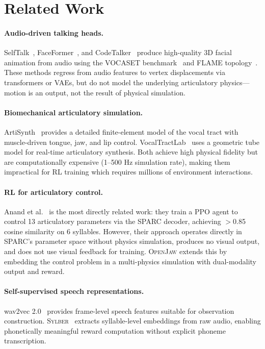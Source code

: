 \documentclass[11pt, a4paper]{article}
\newcommand{\openjaw}{\textsc{OpenJaw}}
\newcommand{\sparc}{\textsc{SPARC}}
\newcommand{\sylber}{\textsc{Sylber}}
\newcommand{\flame}{\textsc{FLAME}}
\begin{document}
\section{Related Work}
\label{sec:related_work}

\paragraph{Audio-driven talking heads.}
SelfTalk~\cite{richard2021selftalk}, FaceFormer~\cite{fan2022faceformer}, and CodeTalker~\cite{xing2023codetalker} produce high-quality 3D facial animation from audio using the VOCASET benchmark~\cite{li2021vocaset} and \flame{} topology~\cite{li2017flame}. These methods regress from audio features to vertex displacements via transformers or VAEs, but do not model the underlying articulatory physics---motion is an output, not the result of physical simulation.

\paragraph{Biomechanical articulatory simulation.}
ArtiSynth~\cite{freeman2023artisynth} provides a detailed finite-element model of the vocal tract with muscle-driven tongue, jaw, and lip control. VocalTractLab~\cite{tian2019vocaltractlab} uses a geometric tube model for real-time articulatory synthesis. Both achieve high physical fidelity but are computationally expensive (1--500 Hz simulation rate), making them impractical for RL training which requires millions of environment interactions.

\paragraph{RL for articulatory control.}
Anand et al.~\cite{anand2025articulatory} is the most directly related work: they train a PPO agent to control 13 articulatory parameters via the \sparc{} decoder, achieving $>$0.85 cosine similarity on 6 syllables. However, their approach operates directly in \sparc{}'s parameter space without physics simulation, produces no visual output, and does not use visual feedback for training. \openjaw{} extends this by embedding the control problem in a multi-physics simulation with dual-modality output and reward.

\paragraph{Self-supervised speech representations.}
wav2vec 2.0~\cite{baevski2020wav2vec} provides frame-level speech features suitable for observation construction. \sylber{}~\cite{cho2024sylber} extracts syllable-level embeddings from raw audio, enabling phonetically meaningful reward computation without explicit phoneme transcription.
\end{document}
